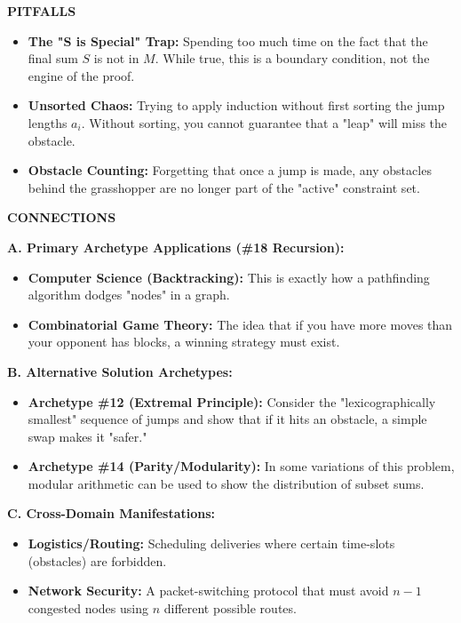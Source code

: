 \documentclass{article}
\begin{document}
\noindent \textbf{PITFALLS}
\begin{itemize}
    \item \textbf{The "S is Special" Trap:} Spending too much time on the fact that the final sum $S$ is not in $M$. While true, this is a boundary condition, not the engine of the proof.
    \item \textbf{Unsorted Chaos:} Trying to apply induction without first sorting the jump lengths $a_i$. Without sorting, you cannot guarantee that a "leap" will miss the obstacle.
    \item \textbf{Obstacle Counting:} Forgetting that once a jump is made, any obstacles behind the grasshopper are no longer part of the "active" constraint set.
\end{itemize}

\noindent \textbf{CONNECTIONS}

\noindent \textbf{A. Primary Archetype Applications (\#18 Recursion):}
\begin{itemize}
    \item \textbf{Computer Science (Backtracking):} This is exactly how a pathfinding algorithm dodges "nodes" in a graph.
    \item \textbf{Combinatorial Game Theory:} The idea that if you have more moves than your opponent has blocks, a winning strategy must exist.
\end{itemize}

\noindent \textbf{B. Alternative Solution Archetypes:}
\begin{itemize}
    \item \textbf{Archetype \#12 (Extremal Principle):} Consider the "lexicographically smallest" sequence of jumps and show that if it hits an obstacle, a simple swap makes it "safer."
    \item \textbf{Archetype \#14 (Parity/Modularity):} In some variations of this problem, modular arithmetic can be used to show the distribution of subset sums.
\end{itemize}

\noindent \textbf{C. Cross-Domain Manifestations:}
\begin{itemize}
    \item \textbf{Logistics/Routing:} Scheduling deliveries where certain time-slots (obstacles) are forbidden.
    \item \textbf{Network Security:} A packet-switching protocol that must avoid $n-1$ congested nodes using $n$ different possible routes.
\end{itemize}
\end{document}
